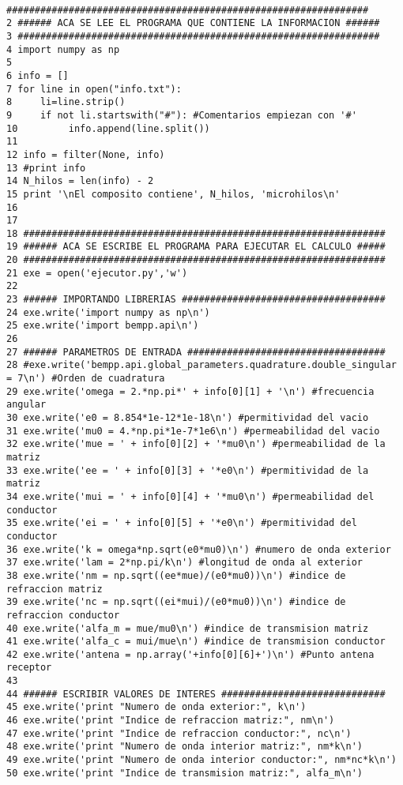 \documentclass[12pt,letterpaper]{article}
\numberwithin{equation}{section}
\begin{document}
\begin{lstlisting}

################################################################
2 ###### ACA SE LEE EL PROGRAMA QUE CONTIENE LA INFORMACION ######
3 ################################################################
4 import numpy as np
5 
6 info = []
7 for line in open("info.txt"):
8     li=line.strip()
9     if not li.startswith("#"): #Comentarios empiezan con '#'
10         info.append(line.split())
11 
12 info = filter(None, info)
13 #print info
14 N_hilos = len(info) - 2
15 print '\nEl composito contiene', N_hilos, 'microhilos\n'
16 
17 
18 ################################################################
19 ###### ACA SE ESCRIBE EL PROGRAMA PARA EJECUTAR EL CALCULO #####
20 ################################################################
21 exe = open('ejecutor.py','w')
22 
23 ###### IMPORTANDO LIBRERIAS ####################################
24 exe.write('import numpy as np\n')
25 exe.write('import bempp.api\n')
26 
27 ###### PARAMETROS DE ENTRADA ###################################
28 #exe.write('bempp.api.global_parameters.quadrature.double_singular = 7\n') #Orden de cuadratura
29 exe.write('omega = 2.*np.pi*' + info[0][1] + '\n') #frecuencia angular
30 exe.write('e0 = 8.854*1e-12*1e-18\n') #permitividad del vacio
31 exe.write('mu0 = 4.*np.pi*1e-7*1e6\n') #permeabilidad del vacio
32 exe.write('mue = ' + info[0][2] + '*mu0\n') #permeabilidad de la matriz
33 exe.write('ee = ' + info[0][3] + '*e0\n') #permitividad de la matriz
34 exe.write('mui = ' + info[0][4] + '*mu0\n') #permeabilidad del conductor
35 exe.write('ei = ' + info[0][5] + '*e0\n') #permitividad del conductor
36 exe.write('k = omega*np.sqrt(e0*mu0)\n') #numero de onda exterior
37 exe.write('lam = 2*np.pi/k\n') #longitud de onda al exterior
38 exe.write('nm = np.sqrt((ee*mue)/(e0*mu0))\n') #indice de refraccion matriz
39 exe.write('nc = np.sqrt((ei*mui)/(e0*mu0))\n') #indice de refraccion conductor
40 exe.write('alfa_m = mue/mu0\n') #indice de transmision matriz
41 exe.write('alfa_c = mui/mue\n') #indice de transmision conductor
42 exe.write('antena = np.array('+info[0][6]+')\n') #Punto antena receptor
43 
44 ###### ESCRIBIR VALORES DE INTERES #############################
45 exe.write('print "Numero de onda exterior:", k\n')
46 exe.write('print "Indice de refraccion matriz:", nm\n')
47 exe.write('print "Indice de refraccion conductor:", nc\n')
48 exe.write('print "Numero de onda interior matriz:", nm*k\n')
49 exe.write('print "Numero de onda interior conductor:", nm*nc*k\n')
50 exe.write('print "Indice de transmision matriz:", alfa_m\n')

\end{lstlisting}
\end{document}
